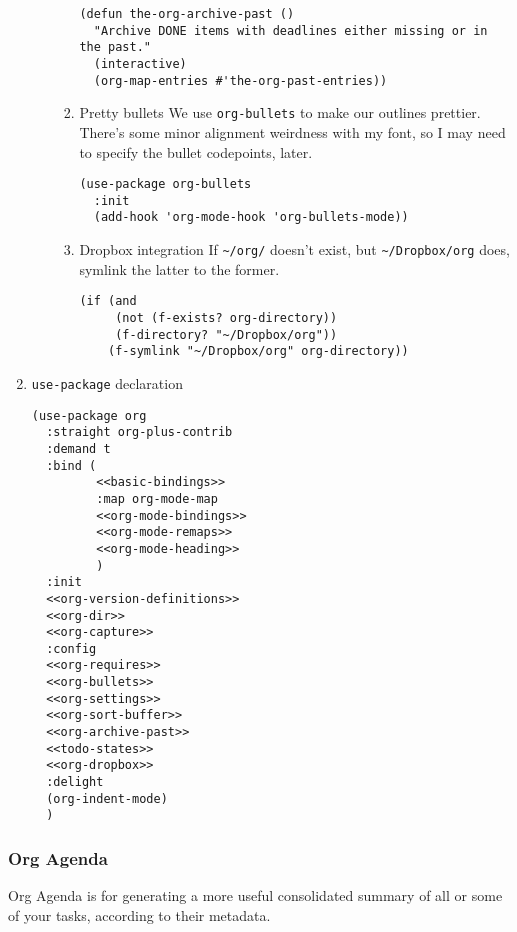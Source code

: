 \documentclass[11pt]{article}
\begin{document}
\begin{enumerate}
\begin{enumerate}
\begin{enumerate}
\begin{verbatim}
(defun the-org-archive-past ()
  "Archive DONE items with deadlines either missing or in the past."
  (interactive)
  (org-map-entries #'the-org-past-entries))
\end{verbatim}

\item Pretty bullets
\label{sec:orgf36e814}
We use \texttt{org-bullets} to make our outlines prettier. There's some minor
alignment weirdness with my font, so I may need to specify the bullet
codepoints, later.
\begin{verbatim}
(use-package org-bullets
  :init
  (add-hook 'org-mode-hook 'org-bullets-mode))
\end{verbatim}

\item Dropbox integration
\label{sec:orgb210cf4}
If \texttt{\textasciitilde{}/org/} doesn't exist, but \texttt{\textasciitilde{}/Dropbox/org} does, symlink the
latter to the former.
\begin{verbatim}
(if (and
     (not (f-exists? org-directory))
     (f-directory? "~/Dropbox/org"))
    (f-symlink "~/Dropbox/org" org-directory))
\end{verbatim}
\end{enumerate}
\end{enumerate}
\item \texttt{use-package} declaration
\label{sec:orga8eee37}

\begin{verbatim}
(use-package org
  :straight org-plus-contrib
  :demand t
  :bind (
         <<basic-bindings>>
         :map org-mode-map
         <<org-mode-bindings>>
         <<org-mode-remaps>>
         <<org-mode-heading>>
         )
  :init
  <<org-version-definitions>>
  <<org-dir>>
  <<org-capture>>
  :config
  <<org-requires>>
  <<org-bullets>>
  <<org-settings>>
  <<org-sort-buffer>>
  <<org-archive-past>>
  <<todo-states>>
  <<org-dropbox>>
  :delight
  (org-indent-mode)
  )
\end{verbatim}
\end{enumerate}

\subsubsection{Org Agenda}
\label{sec:org4e4e697}
Org Agenda is for generating a more useful consolidated summary of all
or some of your tasks, according to their metadata.
\end{document}
